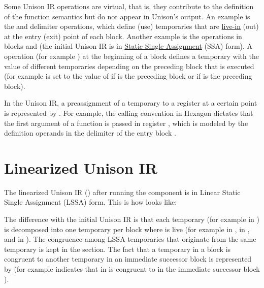 \documentclass[11pt]{report}
\newenvironment{colorBox}[1]
 {\begin{tcolorbox}[
    breakable,
    colback=#1,
    colframe=white,
    boxrule=0pt
  ]}
 {\end{tcolorbox}}
\newenvironment{codeBox}
 {\begin{colorBox}{bgcolor4!20}}
 {\end{colorBox}}
\begin{document}
Some Unison IR operations are virtual, that is, they contribute to the
definition of the function semantics but do not appear in Unison's output.
%
An example is the  and  delimiter operations, which define
(use) temporaries that are
\href{https://en.wikipedia.org/wiki/Live_variable_analysis}{live-in} (out) at
the entry (exit) point of each block.
%
Another example is the  operations in blocks  and 
(the initial Unison IR is in
\href{https://en.wikipedia.org/wiki/Static_single_assignment_form}{Static Single
  Assignment} (SSA) form).
%
A  operation (for example ) at the beginning of a block
defines a temporary with the value of different temporaries depending on the
preceding block that is executed (for example  is set to the value of
 if  is the preceding block or  if  is the
preceding block).

In the Unison IR, a preassignment of a temporary  to a register 
at a certain point is represented by .
%
For example, the calling convention in Hexagon dictates that the first argument
of a function is passed in register , which is modeled by the
definition operands  in the  delimiter of the entry block
.

\section{Linearized Unison IR}\label{sec:lssa}

The linearized Unison IR () after running the  component is in Linear Static Single Assignment (LSSA) form.
%
This is how  looks like:

\begin{codeBox}
\end{codeBox}

The difference with the initial Unison IR is that each temporary  (for
example  in ) is decomposed into one temporary per
block where  is live (for example  in ,  in
, and  in ).
%
The congruence among LSSA temporaries that originate from the same temporary is
kept in the  section.
%
The fact that a temporary  in a block is congruent to another temporary
 in an immediate successor block is represented by  (for
example  indicates that  in  is congruent to
 in the immediate successor block ).
\end{document}
